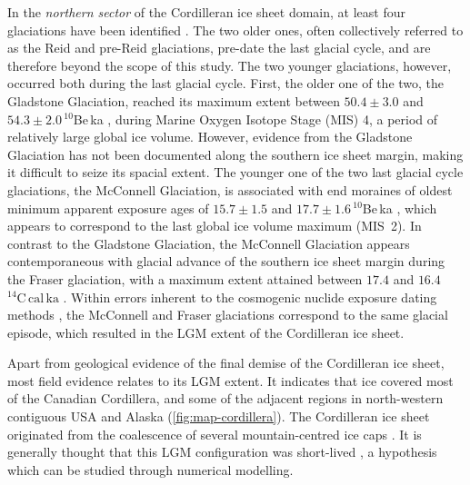 \documentclass[a4paper]{kappa}
\newcommand{\unit}[1]{\ensuremath{\mathrm{#1}}}
\begin{document}
In the \emph{northern sector} of the Cordilleran ice sheet domain, at least
four glaciations have been identified
    \citep{Duk-Rodkin.1999, Ward.etal.2007, Ward.etal.2008,
           Briner.Kaufman.2008, Demuro.etal.2012,
           Stroeven.etal.2010, Stroeven.etal.2014}.
The two older ones, often collectively referred to as the Reid and pre-Reid
glaciations, pre-date the last glacial cycle, and are therefore beyond the
scope of this study. The two younger glaciations, however, occurred both during
the last glacial cycle. First, the older one of the two, the Gladstone
Glaciation,
reached its maximum extent between $50.4\pm3.0$ and $54.3\pm2.0\,^{10}$Be\,ka
\citep{Ward.etal.2007}, during Marine Oxygen Isotope Stage (MIS) 4, a period of
relatively large global ice volume. However, evidence from the Gladstone
Glaciation has not been documented along the southern ice sheet margin, making
it difficult to seize its spacial extent. The younger one of the two last
glacial
cycle glaciations, the McConnell Glaciation, is associated with end moraines of
oldest minimum apparent exposure ages of $15.7\pm1.5$ and
$17.7\pm1.6\,^{10}$Be\,ka \citep{Stroeven.etal.2014}, which appears to
correspond to the last global ice volume maximum (MIS~2). In contrast to the
Gladstone Glaciation, the McConnell Glaciation appears contemporaneous with
glacial advance of the southern ice sheet margin during the Fraser glaciation,
with a maximum extent attained between $17.4$ and
$16.4$\,\unit{^{14}C\,cal\,ka} \citep{Porter.Swanson.1998}. Within errors
inherent to the cosmogenic nuclide exposure dating methods
\citep{Heyman.etal.2011}, the McConnell and Fraser glaciations correspond to
the same glacial episode, which resulted in the LGM extent of the Cordilleran
ice sheet.

Apart from geological evidence of the final demise of the Cordilleran ice sheet, most field
evidence relates to its LGM extent. It indicates that ice covered most of the
Canadian Cordillera, and some of the adjacent regions in north-western
contiguous USA and Alaska (\cref{fig:map-cordillera}). The Cordilleran ice
sheet originated from the coalescence of several mountain-centred ice caps
\citep{Davis.Mathews.1944}. It is generally thought that this LGM configuration
was short-lived \citep{Clague.etal.1980, Clague.1985, Cosma.etal.2008}, a
hypothesis which can be studied through numerical modelling.
\end{document}

